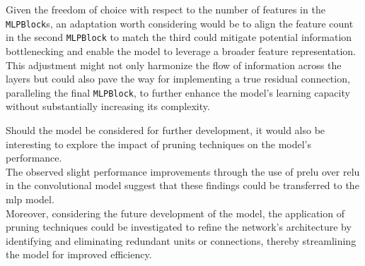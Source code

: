Given the freedom of choice with respect to the number of features in the \texttt{MLPBlock}s, an adaptation worth considering
would be to align the feature count in the second \texttt{MLPBlock} to match the third could mitigate potential information
bottlenecking and enable the model to leverage a broader feature representation. This adjustment might not only harmonize
the flow of information across the layers but could also pave the way for implementing a true residual connection,
paralleling the final \texttt{MLPBlock}, to further enhance the model's learning capacity without substantially increasing its complexity.

Should the model be considered for further development, it would also be interesting to explore the impact of pruning
techniques on the model's performance.\\

The observed slight performance improvements through the use of \gls{prelu} over \gls{relu} in the convolutional model
suggest that these findings could be transferred to the \gls{mlp} model.\\

Moreover, considering the future development of the model, the application of pruning techniques could be investigated
to refine the network's architecture by identifying and eliminating redundant units or connections, thereby streamlining
the model for improved efficiency.
